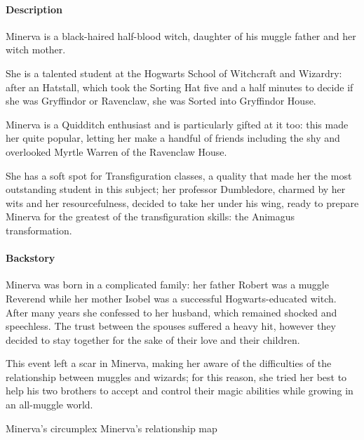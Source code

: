 
\paragraph{Description}
Minerva is a black-haired half-blood witch, daughter of his muggle father and her witch mother.

She is a talented student at the Hogwarts School of Witchcraft and Wizardry: after an Hatstall, which took the Sorting Hat five and a half minutes to decide if she was Gryffindor or Ravenclaw, she was Sorted into Gryffindor House. 

Minerva is a Quidditch enthusiast and is particularly gifted at it too: this made her quite popular, letting her make a handful of friends including the shy and overlooked Myrtle Warren of the Ravenclaw House.

She has a soft spot for Transfiguration classes, a quality that made her the most outstanding student in this subject; her professor Dumbledore, charmed by her wits and her resourcefulness, decided to take her under his wing, ready to prepare Minerva for the greatest of the transfiguration skills: the Animagus transformation.

\paragraph{Backstory}
Minerva was born in a complicated family: her father Robert was a muggle Reverend while her mother Isobel was a successful Hogwarts-educated witch. After many years she confessed to her husband, which remained shocked and speechless. The trust between the spouses suffered a heavy hit, however they decided to stay together for the sake of their love and their children.

This event left a scar in Minerva, making her aware of the difficulties of the relationship between muggles and wizards; for this reason, she tried her best to help his two brothers to accept and control their magic abilities while growing in an all-muggle world.
\pagebreak 

 {Minerva's circumplex}
\pagebreak 
{} {Minerva's relationship map}

\pagebreak


\clearpage